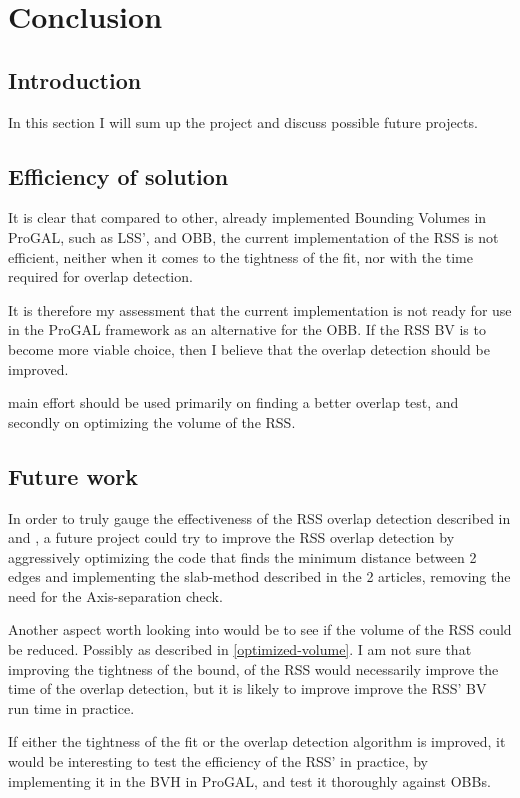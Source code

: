 
\section{Conclusion}
\label{conclusion}
\subsection{Introduction}
In this section I will sum up the project and discuss possible future projects. 

\subsection{Efficiency of solution}
It is clear that compared to other, already implemented Bounding Volumes in ProGAL, such as LSS', and OBB, the current implementation of the RSS is not efficient, neither when it comes to the tightness of the fit, nor with the time required for overlap detection.

It is therefore my assessment that the current implementation is not ready for use in the ProGAL framework as an alternative for the OBB. If the RSS BV is to become more viable choice, then I believe that the overlap detection should be improved.

main effort should be used primarily on finding a better overlap test, and secondly on optimizing the volume of the RSS.

\subsection{Future work}
In order to truly gauge the effectiveness of the RSS overlap detection described in \cite{larsen00fast} and \cite{Larsen99fastproximity}, a future project could try to improve the RSS overlap detection by aggressively optimizing the code that finds the minimum distance between 2 edges and implementing the slab-method described in the 2 articles, removing the need for the Axis-separation check.

Another aspect worth looking into would be to see if the volume of the RSS could be reduced. Possibly as described in \ref{optimized-volume}. I am not sure that improving the tightness of the bound, of the RSS would necessarily improve the time of the overlap detection, but it is likely to improve improve the RSS' BV run time in practice.

If either the tightness of the fit or the overlap detection algorithm is improved, it would be interesting to test the efficiency of the RSS' in practice, by implementing it in the BVH in ProGAL, and test it thoroughly against OBBs. 

